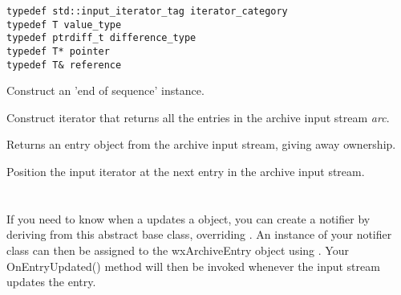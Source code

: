 \begin{verbatim}
typedef std::input_iterator_tag iterator_category
typedef T value_type
typedef ptrdiff_t difference_type
typedef T* pointer
typedef T& reference
\end{verbatim}



\label{wxarchiveiteratorwxarchiveiterator}


Construct an 'end of sequence' instance.


Construct iterator that returns all the entries in the archive input
stream {\it arc}.


\label{wxarchiveiteratoroperatorunknown}


Returns an entry object from the archive input stream, giving away
ownership.


\label{wxarchiveiteratoroperatorunknown}



Position the input iterator at the next entry in the archive input stream.


%
%

\section{}\label{wxarchivenotifier}

If you need to know when a
  updates a
  object, you can create
a notifier by deriving from this abstract base class, overriding
 .  An instance
of your notifier class can then be assigned to the wxArchiveEntry object
using .
Your OnEntryUpdated() method will then be invoked whenever the input
stream updates the entry.

